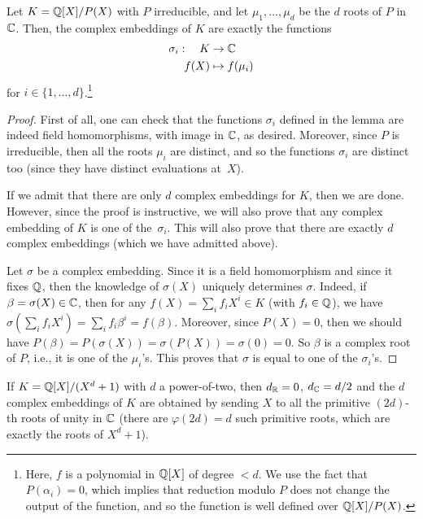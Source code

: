 \begin{lemma}
Let $K = \mathbb{Q}[X]/P(X)$ with $P$ irreducible, and let $\mu_1, \dots, \mu_d$ be the $d$ roots of $P$ in~$\mathbb{C}$. Then, the complex embeddings of $K$ are exactly the functions
\begin{align*}
\sigma_i: \ \ \ K & \rightarrow \mathbb{C} \\
                f(X) & \mapsto f(\mu_i)
\end{align*}
for $i \in \{1, \dots, d\}$.\footnote{Here, $f$ is a polynomial in $\mathbb{Q}[X]$ of degree $< d$. We use the fact that $P(\alpha_i) = 0$, which implies that reduction modulo $P$ does not change the output of the function, and so the function is well defined over $\mathbb{Q}[X]/P(X)$.}
\end{lemma}

\begin{proof}
First of all, one can check that the functions $\sigma_i$ defined in the lemma are indeed field homomorphisms, with image in $\mathbb{C}$, as desired. Moreover, since $P$ is irreducible, then all the roots $\mu_i$ are distinct, and so the functions $\sigma_i$ are distinct too (since they have distinct evaluations at~$X$).

If we admit that there are only $d$ complex embeddings for $K$, then we are done. However, since the proof is instructive, we will also prove that any complex embedding of $K$ is one of the~$\sigma_i$. This will also prove that there are exactly $d$ complex embeddings (which we have admitted above).

Let $\sigma$ be a complex embedding. Since it is a field homomorphism and since it fixes $\mathbb{Q}$, then the knowledge of $\sigma(X)$ uniquely determines $\sigma$. Indeed, if $\beta = \sigma(X) \in \mathbb{C}$, then for any $f(X) = \sum_i f_i X^i \in K$ (with $f_i \in \mathbb{Q}$), we have $\sigma(\sum_i f_i X^i) = \sum_i f_i \beta^i = f(\beta)$.
Moreover, since $P(X) = 0$, then we should have $P(\beta) = P(\sigma(X)) = \sigma(P(X)) = \sigma(0) = 0$. So $\beta$ is a complex root of $P$, i.e., it is one of the $\mu_i$'s. This proves that $\sigma$ is equal to one of the $\sigma_i$'s.
\end{proof}

\begin{example}
If $K = \mathbb{Q}[X]/(X^d+1)$ with $d$ a power-of-two, then $d_{\mathbb{R}} = 0$, $d_{\mathbb{C}} = d/2$ and the $d$ complex embeddings of $K$ are obtained by sending $X$ to all the primitive $(2d)$-th roots of unity in $\mathbb{C}$ (there are $\varphi(2d) = d$ such primitive roots, which are exactly the roots of $X^d+1$).
\end{example}

